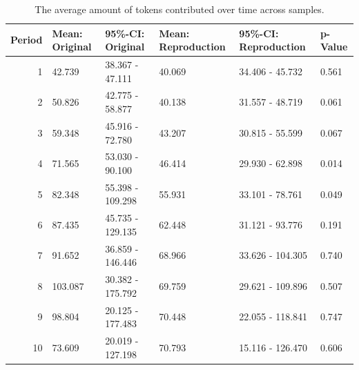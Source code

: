 \documentclass[
  authoryear,
  review,
  3p,
  onecolumn]{elsarticle}
\begin{document}
\hypertarget{tbl-contribution-periods}{}
\begin{table}
\caption{\label{tbl-contribution-periods}The average amount of tokens contributed over time across samples. }\tabularnewline

\centering
\begin{tabular}{r|l|l|l|l|l}
\hline
Period & Mean: Original & 95\%-CI: Original & Mean: Reproduction & 95\%-CI: Reproduction & p-Value\\
\hline
1 & 42.739 & 38.367 - 47.111 & 40.069 & 34.406 - 45.732 & 0.561\\
\hline
2 & 50.826 & 42.775 - 58.877 & 40.138 & 31.557 - 48.719 & 0.061\\
\hline
3 & 59.348 & 45.916 - 72.780 & 43.207 & 30.815 - 55.599 & 0.067\\
\hline
4 & 71.565 & 53.030 - 90.100 & 46.414 & 29.930 - 62.898 & 0.014\\
\hline
5 & 82.348 & 55.398 - 109.298 & 55.931 & 33.101 - 78.761 & 0.049\\
\hline
6 & 87.435 & 45.735 - 129.135 & 62.448 & 31.121 - 93.776 & 0.191\\
\hline
7 & 91.652 & 36.859 - 146.446 & 68.966 & 33.626 - 104.305 & 0.740\\
\hline
8 & 103.087 & 30.382 - 175.792 & 69.759 & 29.621 - 109.896 & 0.507\\
\hline
9 & 98.804 & 20.125 - 177.483 & 70.448 & 22.055 - 118.841 & 0.747\\
\hline
10 & 73.609 & 20.019 - 127.198 & 70.793 & 15.116 - 126.470 & 0.606\\
\hline
\end{tabular}
\end{table}
\end{document}
